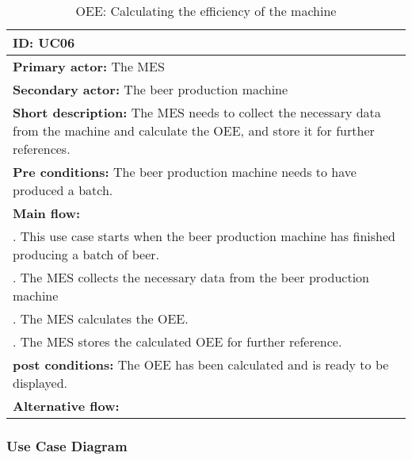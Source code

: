 \begin{table}[ht]
    \begin{tabularx}{\textwidth}{|>{\RaggedRight}X|}
        \hline
        \textbf{ID:} UC06  \\
        \hline
        \textbf{Primary actor:} The MES \\
        \hline
        \textbf{Secondary actor:} The beer production machine \\
        \hline
        \textbf{Short description:} The MES needs to collect the necessary data
        from the machine and calculate the OEE, and store it for
        further references. \\
        \hline
        \textbf{Pre conditions:} The beer production machine needs to have
        produced a batch. \\
        \hline
        \textbf{Main flow:} \\
        	1. This use case starts when the beer production machine has
        	finished producing a batch of beer. \\
			2. The MES collects the necessary data from the beer production
			machine \\
			3. The MES calculates the OEE. \\
			4. The MES stores the calculated OEE for further reference. \\ 
		\hline
        \textbf{post conditions:} The OEE has been calculated and is ready to
        be displayed. \\
        \hline
        \textbf{Alternative flow:} \\
        \hline
    \end{tabularx}
    \caption{OEE: Calculating the efficiency of the machine}
    \label{table:usecase_oee}
\end{table}

\subsubsection{Use Case Diagram}
